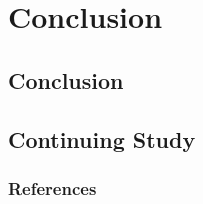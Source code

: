 \documentclass[9pt]{beamer}
\begin{document}
\section{Conclusion}
\subsection{Conclusion}

\subsection{Continuing Study}


\begin{frame}[allowframebreaks]
  \frametitle{References}
  
  {\footnotesize  }

\end{frame}



\end{document}

